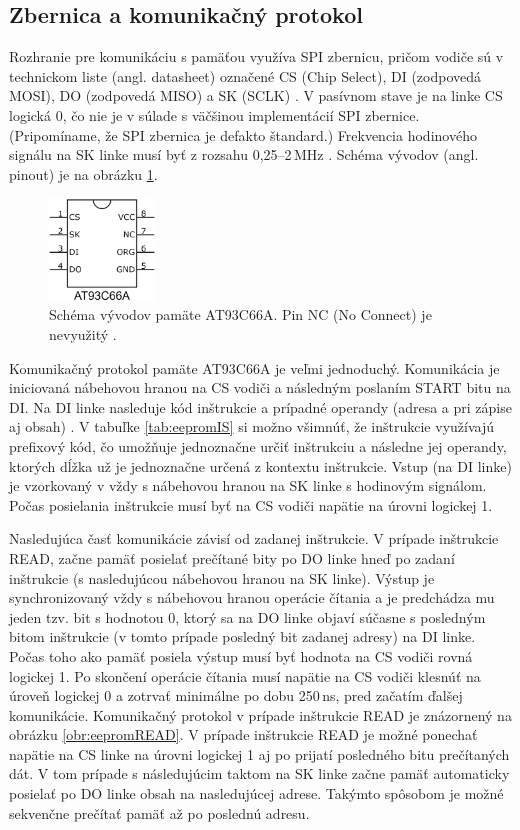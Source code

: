 \subsection{Zbernica a komunikačný protokol}
Rozhranie pre komunikáciu s pamäťou využíva SPI zbernicu, pričom vodiče sú v technickom liste (angl. datasheet) označené CS (Chip Select), DI (zodpovedá MOSI), DO (zodpovedá MISO) a SK (SCLK) \cite{eepromDatasheet}. V pasívnom stave je na linke CS logická 0, čo nie je v súlade s väčšinou implementácií SPI zbernice. (Pripomíname, že SPI zbernica je defakto štandard.) Frekvencia hodinového signálu na SK linke musí byť z rozsahu 0,25--2\,MHz \cite{eepromDatasheet}. Schéma vývodov (angl. pinout) je na obrázku \ref{obr:eepromPinout}.

\begin{figure}[h!]
    \centerline{\includegraphics[width=0.25\textwidth]{images/at93c66aPinout.png}}
    \caption[Schéma vývodov pamäte AT93C66A]{Schéma vývodov pamäte AT93C66A. Pin NC (No Connect) je nevyužitý \cite{eepromDatasheet}.}
    \label{obr:eepromPinout}
\end{figure}

Komunikačný protokol pamäte AT93C66A je veľmi jednoduchý. Komunikácia je iniciovaná nábehovou hranou na CS vodiči a následným poslaním START bitu na DI. Na DI linke nasleduje kód inštrukcie a prípadné operandy (adresa a pri zápise aj obsah) \cite{eepromDatasheet}. V tabuľke \ref{tab:eepromIS} si možno všimnúť, že inštrukcie využívajú prefixový kód, čo umožňuje jednoznačne určiť inštrukciu a následne jej operandy, ktorých dĺžka už je jednoznačne určená z kontextu inštrukcie. Vstup (na DI linke) je vzorkovaný v vždy s nábehovou hranou na SK linke s hodinovým signálom. Počas posielania inštrukcie musí byť na CS vodiči napätie na úrovni logickej 1.

Nasledujúca časť komunikácie závisí od zadanej inštrukcie. V prípade inštrukcie READ, začne pamäť posielať prečítané bity po DO linke hneď po zadaní inštrukcie (s nasledujúcou nábehovou hranou na SK linke). Výstup je synchronizovaný vždy s nábehovou hranou operácie čítania a je predchádza mu jeden tzv.  bit s hodnotou 0, ktorý sa na DO linke objaví súčasne s posledným bitom inštrukcie (v tomto prípade posledný bit zadanej adresy) na DI linke. Počas toho ako pamäť posiela výstup musí byť hodnota na CS vodiči rovná logickej 1. Po skončení operácie čítania musí napätie na CS vodiči klesnúť na úroveň logickej 0 a zotrvať minimálne po dobu 250\,ns, pred začatím ďalšej komunikácie. Komunikačný protokol v prípade inštrukcie READ je znázornený na obrázku \ref{obr:eepromREAD}. V prípade inštrukcie READ je možné ponechať napätie na CS linke na úrovni logickej 1 aj po prijatí posledného bitu prečítaných dát. V tom prípade s následujúcim taktom na SK linke začne pamäť automaticky posielať po DO linke obsah na nasledujúcej adrese. Takýmto spôsobom je možné sekvenčne prečítať pamäť až po poslednú adresu.

